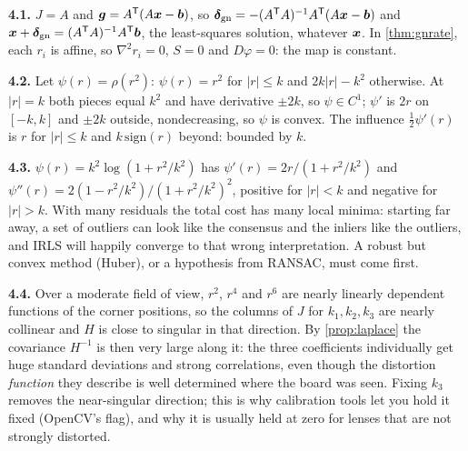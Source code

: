 \textbf{4.1.} $J=A$ and $\bm{g}=A^{\mathsf{T}}(A\bm{x}-\bm{b})$, so
$\bm{\delta}_{\mathrm{gn}}=-(A^{\mathsf{T}} A)^{-1}A^{\mathsf{T}}(A\bm{x}-\bm{b})$ and
$\bm{x}+\bm{\delta}_{\mathrm{gn}}=(A^{\mathsf{T}} A)^{-1}A^{\mathsf{T}}\bm{b}$, the least-squares
solution, whatever $\bm{x}$. In \cref{thm:gnrate}, each $r_i$ is affine, so
$\nabla^2r_i=0$, $S=0$ and $D\varphi=0$: the map is constant.

\textbf{4.2.} Let $\psi(r)=\rho(r^2)$: $\psi(r)=r^2$ for $|r|\le k$ and
$2k|r|-k^2$ otherwise. At $|r|=k$ both pieces equal $k^2$ and have
derivative $\pm2k$, so $\psi\in C^1$; $\psi'$ is $2r$ on $[-k,k]$ and
$\pm2k$ outside, nondecreasing, so $\psi$ is convex. The influence
$\frac12\psi'(r)$ is $r$ for $|r|\le k$ and $k\,\mathrm{sign}(r)$
beyond: bounded by $k$.

\textbf{4.3.} $\psi(r)=k^2\log(1+r^2/k^2)$ has
$\psi'(r)=2r/(1+r^2/k^2)$ and
$\psi''(r)=2(1-r^2/k^2)/(1+r^2/k^2)^2$, positive for $|r|<k$ and negative
for $|r|>k$. With many residuals the total cost has many local minima:
starting far away, a set of outliers can look like the consensus and the
inliers like the outliers, and IRLS will happily converge to that wrong
interpretation. A robust but convex method (Huber), or a hypothesis from
RANSAC, must come first.

\textbf{4.4.} Over a moderate field of view, $r^2$, $r^4$ and $r^6$ are
nearly linearly dependent functions of the corner positions, so the
columns of $J$ for $k_1,k_2,k_3$ are nearly collinear and $H$ is close to
singular in that direction. By \cref{prop:laplace} the covariance
$H^{-1}$ is then very large along it: the three coefficients
individually get huge standard deviations and strong correlations, even
though the distortion \emph{function} they describe is well determined
where the board was seen. Fixing $k_3$ removes the near-singular
direction; this is why calibration tools let you hold it fixed (OpenCV's
 flag), and why it is usually held at zero for
lenses that are not strongly distorted.
